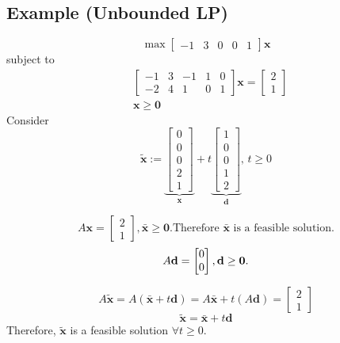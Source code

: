 \subsection{Example (Unbounded LP)}
\[\max 
\begin{bmatrix}
    -1 & 3 & 0 & 0 & 1
\end{bmatrix}\mathbf{x}\]
subject to
\begin{align*}
    &\begin{bmatrix}
        -1 & 3 & -1 & 1 & 0\\
        -2 & 4 & 1 & 0 & 1
    \end{bmatrix}
    \mathbf{x}
    =
    \begin{bmatrix}
        2\\
        1
    \end{bmatrix}\\
    &\mathbf{x}\ge \mathbf{0}
\end{align*}
Consider
\[\mathbf{\tilde{x}}:=
\underbrace{\begin{bmatrix}
    0\\
    0\\
    0\\
    2\\
    1  
\end{bmatrix}}_{\mathbf{x}}
+
t
\underbrace{\begin{bmatrix}
    1\\
    0\\
    0\\
    1\\
    2
\end{bmatrix}}_{\mathbf{d}} \text{, } t\ge 0
\]

\[
    A\mathbf{x}=
    \begin{bmatrix}
        2\\
        1
    \end{bmatrix}, \bar{\mathbf{x}}\ge \mathbf{0}.\text{Therefore $\bar{\mathbf{x}}$ is a feasible solution.}
\]
\[
    A\mathbf{d}=\begin{bmatrix}
        0\\
        0
    \end{bmatrix}, \mathbf{d}\ge \mathbf{0}.\\
\]

\[A\tilde{\mathbf{x}}=A(\bar{\mathbf{x}}+t\mathbf{d})=A\bar{\mathbf{x}}+t(A\mathbf{d})=
\begin{bmatrix}
    2\\
    1
\end{bmatrix}\]
\[\tilde{\mathbf{x}}=\bar{\mathbf{x}}+t\mathbf{d}\]
Therefore, $\tilde{\mathbf{x}}$ is a feasible solution $\forall t\ge 0$.


